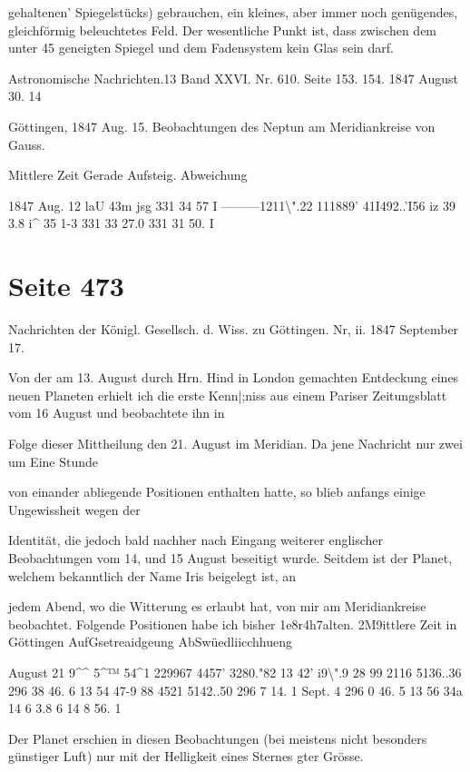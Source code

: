 \documentclass[10pt,a4paper]{article}
\begin{document}
gehaltenen' Spiegelstücks) gebrauchen, ein kleines, aber immer noch genügendes, gleichförmig beleuchtetes Feld. Der wesentliche Punkt ist, dass zwischen dem unter 45\textdegree{} geneigten Spiegel und dem Fadensystem kein Glas sein darf.

Astronomische Nachrichten.13 Band XXVI. Nr. 610. Seite 153. 154. 1847 August 30. 14

Göttingen, 1847 Aug. 15. Beobachtungen des Neptun am Meridiankreise von Gauss.

Mittlere Zeit Gerade Aufsteig. Abweichung

1847 Aug. 12 laU 43m jsg 331 34 57 I ———1211\textbackslash{}".22 111889' 41I492..'I56 iz 39 3.8 i\textasciicircum{} 35 1-3 331 33 27.0 331 31 50. I


\newpage
\section*{Seite 473}
Nachrichten der Königl. Gesellsch. d. Wiss. zu Göttingen. Nr, ii. 1847 September 17.

Von der am 13. August durch Hrn. Hind in London gemachten Entdeckung eines neuen Planeten erhielt ich die erste Kenn|;niss aus einem Pariser Zeitungsblatt vom 16 August und beobachtete ihn in

Folge dieser Mittheilung den 21. August im Meridian. Da jene Nachricht nur zwei um Eine Stunde

von einander abliegende Positionen enthalten hatte, so blieb anfangs einige Ungewissheit wegen der

Identität, die jedoch bald nachher nach Eingang weiterer englischer Beobachtungen vom 14, und 15 August beseitigt wurde. Seitdem ist der Planet, welchem bekanntlich der Name Iris beigelegt ist, an

jedem Abend, wo die Witterung es erlaubt hat, von mir am Meridiankreise beobachtet. Folgende Positionen habe ich bisher 1e8r4h7alten. 2M9ittlere Zeit in Göttingen AufGsetreaidgeung AbSwüedliicchhueng

August 21 9\textasciicircum{}\textasciicircum{} 5\textasciicircum{}™ 54\textasciicircum{}1 229967\textdegree{} 4457' 3280."82 13\textdegree{} 42' i9\textbackslash{}".9 28 99 2116 5136..36 296 38 46. 6 13 54 47-9 88 4521 5142..50 296 7 14. 1 Sept. 4 296 0 46. 5 13 56 34a 14 6 3.8 6 14 8 56. 1

Der Planet erschien in diesen Beobachtungen (bei meistens nicht besonders günstiger Luft) nur mit der Helligkeit eines Sternes gter Grösse.
\end{document}
